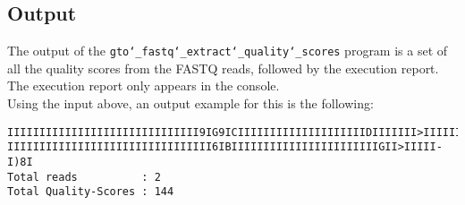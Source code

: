 \subsection*{Output}
The output of the \texttt{gto\char`_fastq\char`_extract\char`_quality\char`_scores} program is a set of all the quality scores from the FASTQ reads, followed by the execution report.
The execution report only appears in the console.\\
Using the input above, an output example for this is the following:
\begin{lstlisting}
IIIIIIIIIIIIIIIIIIIIIIIIIIIIII9IG9ICIIIIIIIIIIIIIIIIIIIIDIIIIIII>IIIIII/
IIIIIIIIIIIIIIIIIIIIIIIIIIIIIIII6IBIIIIIIIIIIIIIIIIIIIIIIIGII>IIIII-I)8I
Total reads          : 2
Total Quality-Scores : 144
\end{lstlisting}
